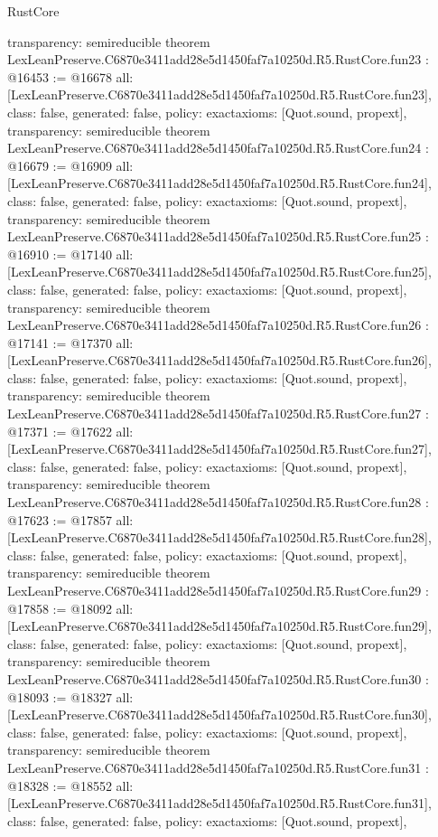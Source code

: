 \begin{lexlean}{RustCore}
\begin{coremodule}
{  transparency: semireducible
}
theorem LexLeanPreserve.C6870e3411add28e5d1450faf7a10250d.R5.RustCore.fun23 : @16453 := @16678 {
  all: [LexLeanPreserve.C6870e3411add28e5d1450faf7a10250d.R5.RustCore.fun23],
  class: false,
  generated: false,
  policy: exact{axioms: [Quot.sound, propext]},
  transparency: semireducible
}
theorem LexLeanPreserve.C6870e3411add28e5d1450faf7a10250d.R5.RustCore.fun24 : @16679 := @16909 {
  all: [LexLeanPreserve.C6870e3411add28e5d1450faf7a10250d.R5.RustCore.fun24],
  class: false,
  generated: false,
  policy: exact{axioms: [Quot.sound, propext]},
  transparency: semireducible
}
theorem LexLeanPreserve.C6870e3411add28e5d1450faf7a10250d.R5.RustCore.fun25 : @16910 := @17140 {
  all: [LexLeanPreserve.C6870e3411add28e5d1450faf7a10250d.R5.RustCore.fun25],
  class: false,
  generated: false,
  policy: exact{axioms: [Quot.sound, propext]},
  transparency: semireducible
}
theorem LexLeanPreserve.C6870e3411add28e5d1450faf7a10250d.R5.RustCore.fun26 : @17141 := @17370 {
  all: [LexLeanPreserve.C6870e3411add28e5d1450faf7a10250d.R5.RustCore.fun26],
  class: false,
  generated: false,
  policy: exact{axioms: [Quot.sound, propext]},
  transparency: semireducible
}
theorem LexLeanPreserve.C6870e3411add28e5d1450faf7a10250d.R5.RustCore.fun27 : @17371 := @17622 {
  all: [LexLeanPreserve.C6870e3411add28e5d1450faf7a10250d.R5.RustCore.fun27],
  class: false,
  generated: false,
  policy: exact{axioms: [Quot.sound, propext]},
  transparency: semireducible
}
theorem LexLeanPreserve.C6870e3411add28e5d1450faf7a10250d.R5.RustCore.fun28 : @17623 := @17857 {
  all: [LexLeanPreserve.C6870e3411add28e5d1450faf7a10250d.R5.RustCore.fun28],
  class: false,
  generated: false,
  policy: exact{axioms: [Quot.sound, propext]},
  transparency: semireducible
}
theorem LexLeanPreserve.C6870e3411add28e5d1450faf7a10250d.R5.RustCore.fun29 : @17858 := @18092 {
  all: [LexLeanPreserve.C6870e3411add28e5d1450faf7a10250d.R5.RustCore.fun29],
  class: false,
  generated: false,
  policy: exact{axioms: [Quot.sound, propext]},
  transparency: semireducible
}
theorem LexLeanPreserve.C6870e3411add28e5d1450faf7a10250d.R5.RustCore.fun30 : @18093 := @18327 {
  all: [LexLeanPreserve.C6870e3411add28e5d1450faf7a10250d.R5.RustCore.fun30],
  class: false,
  generated: false,
  policy: exact{axioms: [Quot.sound, propext]},
  transparency: semireducible
}
theorem LexLeanPreserve.C6870e3411add28e5d1450faf7a10250d.R5.RustCore.fun31 : @18328 := @18552 {
  all: [LexLeanPreserve.C6870e3411add28e5d1450faf7a10250d.R5.RustCore.fun31],
  class: false,
  generated: false,
  policy: exact{axioms: [Quot.sound, propext]},
}
\end{coremodule}
\end{lexlean}
